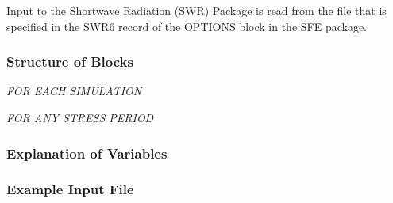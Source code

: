 Input to the Shortwave Radiation (SWR) Package is read from the file that is specified in the SWR6 record of the OPTIONS block in the SFE package.

\vspace{5mm}
\subsubsection{Structure of Blocks}
\vspace{5mm}

\noindent \textit{FOR EACH SIMULATION}

\vspace{5mm}
\noindent \textit{FOR ANY STRESS PERIOD}


\vspace{5mm}
\subsubsection{Explanation of Variables}
\begin{description}

\end{description}

\vspace{5mm}
\subsubsection{Example Input File}

